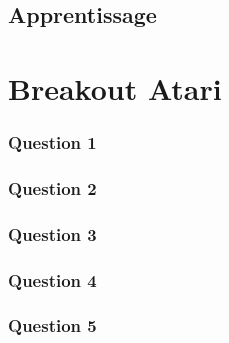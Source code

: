 \documentclass[10pt,a4paper]{article}
\begin{document}
\subsection{Apprentissage}

\section{Breakout Atari}

\subsubsection{Question 1}

\subsubsection{Question 2}

\subsubsection{Question 3}

\subsubsection{Question 4}

\subsubsection{Question 5}
\end{document}
